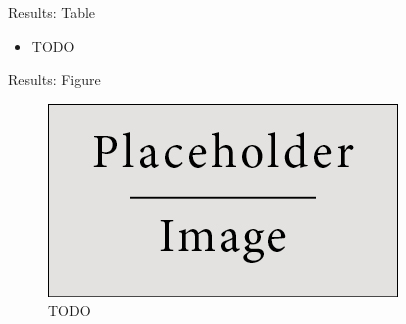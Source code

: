 \documentclass[final,hyperref={pdfpagelabels=false}]{beamer}
\begin{document}
\begin{frame}[t]
\begin{columns}[t]
\begin{column}{.465\textwidth}
\begin{block}{Results: Table}

\begin{itemize}
\item TODO
\end{itemize}



     
\end{block}


\begin{block}{Results: Figure}

\begin{figure}
\includegraphics[width=0.8\linewidth]{placeholder.jpg}
\caption{TODO}
\end{figure}


\end{block}
\end{column}
\end{columns}
\end{frame}
\end{document}
